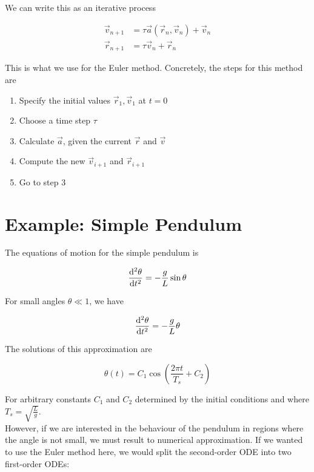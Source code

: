 \documentclass[]{article}
\begin{document}
We can write this as an iterative process

\begin{align*}
	\vec{v}_{n+1} &= \tau\vec{a}(\vec{r}_{n}, \vec{v}_{n}) + \vec{v}_{n}\\
	\vec{r}_{n+1} &= \tau\vec{v}_{n} + \vec{r}_{n}
\end{align*}

This is what we use for the Euler method. Concretely, the steps for this method are

\begin{enumerate}
	\item Specify the initial values $\vec{r}_1, \vec{v}_1$ at $t=0$
	\item Choose a time step $\tau$
	\item Calculate $\vec{a}$, given the current $\vec{r}$ and $\vec{v}$
	\item Compute the new $\vec{v}_{i+1}$ and $\vec{r}_{i+1}$
	\item Go to step 3
\end{enumerate}


\section{Example: Simple Pendulum}\bigbreak\bigbreak

The equations of motion for the simple pendulum is

\begin{equation}
	\dv[2]{\theta}{t} = -\frac{g}{L}\sin\theta
\end{equation}

For small angles $\theta \ll 1$, we have

\begin{equation*}
	\dv[2]{\theta}{t} = -\frac{g}{L}\theta
\end{equation*}

The solutions of this approximation are

\begin{equation*}
	\theta(t) = C_1 \cos(\frac{2\pi t}{T_s} + C_2)
\end{equation*}

For arbitrary constants $C_1$ and $C_2$ determined by the initial conditions and where $T_s = \sqrt{\frac{L}{g}}$.\\

However, if we are interested in the behaviour of the pendulum in regions where the angle is not small, we must result to numerical approximation. If we wanted to use the Euler method here, we would split the second-order ODE into two first-order ODEs:
\end{document}
